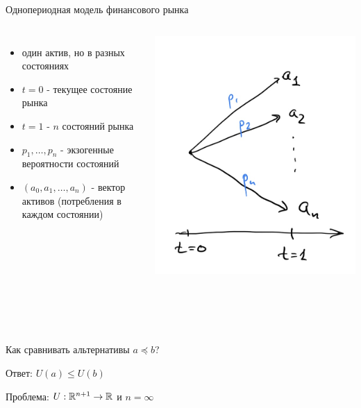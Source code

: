 \documentclass{beamer}
\begin{document}
\begin{frame}{Однопериодная модель финансового рынка}

\begin{columns}
\begin{itemize}
\item один актив, но в разных состояниях 
\item $t=0$ - текущее состояние рынка
\item $t=1$ - $n$ состояний рынка
\item $p_1, \ldots, p_n$ - экзогенные вероятности состояний
\item $(a_0,a_1,\ldots, a_n)$ - вектор активов (потребления в каждом состоянии)
\end{itemize}

        \includegraphics[width=1.0\textwidth]{2_figs/oneperiod.jpeg}


\end{columns}

\centering

\

\

Как сравнивать альтернативы $a \preceq  b$?

\pause
Ответ: $U(a) \leq U(b)$

Проблема: $U: \mathbb{R}^{n+1} \to \mathbb{R}$ и $n=\infty$ 
   
\end{frame}
\end{document}
